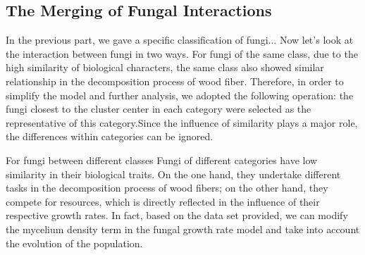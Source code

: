 \documentclass[12pt]{article}
\begin{document}


\subsection{The Merging of Fungal Interactions}
In the previous part, we gave a specific classification of fungi...
Now let's look at the interaction between fungi in two ways.
For fungi of the same class, due to the high similarity of biological characters, the same class also showed similar relationship in the decomposition process of wood fiber.
Therefore, in order to simplify the model and further analysis, we adopted the following operation: the fungi closest to the cluster center in each category were selected as the representative of this category.Since the influence of similarity plays a major role, the differences within categories can be ignored.


For fungi between different classes
Fungi of different categories have low similarity in their biological traits. On the one hand, they undertake different tasks in the decomposition process of wood fibers; on the other hand, they compete for resources, which is directly reflected in the influence of their respective growth rates.
In fact, based on the data set provided\cite{3}, we can modify the mycelium density term in the fungal growth rate model and take into account the evolution of the population.

\end{document}
